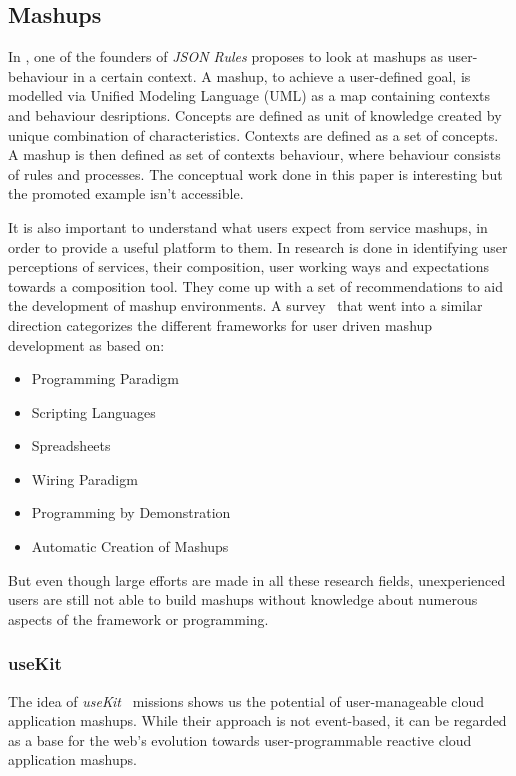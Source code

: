 \documentclass[11pt]{article}%
\begin{document}
\subsection{Mashups}
In \cite{2011-Pascalau-MBC.pdf}, one of the founders of \emph{JSON Rules} proposes to look at mashups as user-behaviour in a certain context. A mashup, to achieve a user-defined goal, is modelled via Unified Modeling Language (UML) as a map containing contexts and behaviour desriptions. Concepts are defined as unit of knowledge created by unique combination of characteristics. Contexts are defined as a set of concepts. A mashup is then defined as  set of contexts behaviour, where behaviour consists of rules and processes. The conceptual work done in this paper is interesting but the promoted example isn't accessible.

It is also important to understand what users expect from service mashups, in order to provide a useful platform to them. In \cite{2010-Namoun_etal-EURCW.pdf} research is done in identifying user perceptions of services, their composition, user working ways and expectations towards a composition tool. They come up with a set of recommendations to aid the development of mashup environments. A survey~\cite{2009-Fischer_etal-OCAMG.pdf} that went into a similar direction categorizes the different frameworks for user driven mashup development as based on:
 \begin{itemize}
  \item Programming Paradigm
  \item Scripting Languages
  \item Spreadsheets
  \item Wiring Paradigm
  \item Programming by Demonstration
  \item Automatic Creation of Mashups
\end{itemize}
But even though large efforts are made in all these research fields, unexperienced users are still not able to build mashups without knowledge about numerous aspects of the framework or programming.

\subsubsection{useKit}
The idea of \emph{useKit}~\cite{2010-Rizzotti_Burkhart-useKit.pdf} missions shows us the potential of user-manageable cloud application mashups. While their approach is not event-based, it can be regarded as a base for the web's evolution towards user-programmable reactive cloud application mashups.
\end{document}
